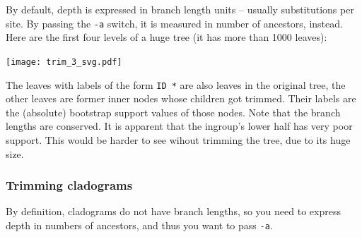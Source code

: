 By default, depth is expressed in branch length units -- usually substitutions
per site. By passing the \texttt{-a} switch, it is measured in number of
ancestors, instead. Here are the first four levels of a huge tree (it has more than 1000 leaves):


\begin{center}
\texttt{[image: trim\_3\_svg.pdf]}
\end{center}

\noindent{}The leaves with labels of the form \texttt{ID *} are also leaves in
the original tree, the other leaves are former inner nodes whose children got
trimmed.  Their labels are the (absolute) bootstrap support values of those
nodes. Note that the branch lengths are conserved. It is apparent that the
ingroup's lower half has very poor support. This would be harder to see wihout
trimming the tree, due to its huge size.

\subsubsection{Trimming cladograms}

By definition, cladograms do not have branch lengths, so you need to express depth in numbers of ancestors, and thus you want to pass \texttt{-a}.
